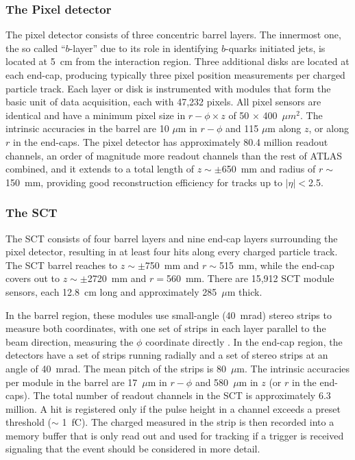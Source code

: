 \subsubsection{The Pixel detector}

The pixel detector consists of three concentric barrel layers. The innermost one, the so called ``$b$-layer'' due to its role in identifying $b$-quarks initiated jets, is located at 5~cm from the interaction region. Three additional disks are located at each end-cap, producing typically three pixel position measurements per charged particle track.  Each layer or disk is instrumented with modules that form the basic unit of data acquisition, each with 47,232 pixels.  All pixel sensors are identical and have a minimum pixel size in $r - \phi \times z$ of 50 $\times$ 400~$\mu m^2$. The intrinsic accuracies in the barrel are 10 $\mu$m in $r - \phi$ and 115 $\mu$m along $z$, or along $r$ in the end-caps. The pixel detector has approximately 80.4 million readout channels, an order of magnitude more readout channels than the rest of ATLAS combined, and it extends to a total length of $z \sim \pm$650~mm and radius of $r \sim$150~mm, providing good reconstruction efficiency for tracks up to $|\eta| <$2.5.

 
\subsubsection{The SCT}


The SCT consists of four barrel layers and nine end-cap layers surrounding the pixel detector, resulting in at least four hits along every charged particle track.  The SCT barrel reaches to $z\sim \pm$750~mm and $r \sim $515~mm, while the end-cap covers out to $z\sim \pm$2720~mm and $r =$560~mm.  There are 15,912 SCT module sensors, each 12.8~cm long and approximately 285~$\mu $m thick. 

In the barrel region, these modules use small-angle (40~mrad) stereo strips to measure both coordinates, with one set of strips in each layer parallel to the beam direction, measuring the $\phi$ coordinate directly . In the end-cap region, the detectors have a set of strips running radially and a set of stereo strips at an angle of 40~mrad. The mean pitch of the strips is 80~$\mu$m. The intrinsic accuracies per module in the barrel are 17~$\mu$m in $r - \phi $ and 580~$\mu$m in $z$ (or $r$ in the end-caps). The total number of readout channels in the SCT is approximately 6.3 million.  A hit is registered only if the pulse height in a channel exceeds a preset threshold ($\sim $ 1~fC). The charged measured in the strip is then recorded into a memory buffer that is only read out and used for tracking if a trigger is received signaling that the event should be considered in more detail.



